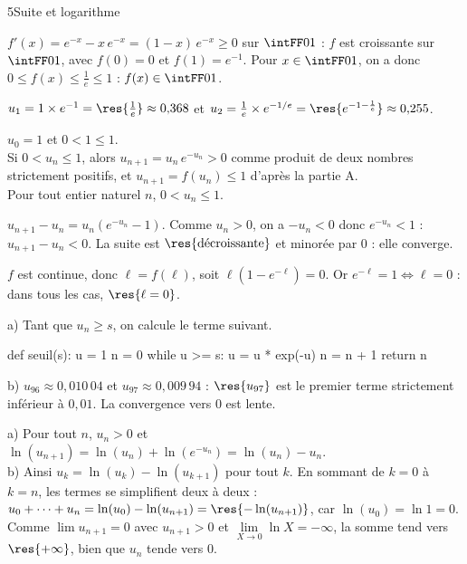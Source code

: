 \begin{corrigeBac}{5}{Suite et logarithme}
\begin{questions}
  \item $f'(x)=e^{-x}-x\,e^{-x}=(1-x)\,e^{-x}\geq0$ sur $\intFF01$ : $f$ est croissante sur $\intFF01$, avec $f(0)=0$ et $f(1)=e^{-1}$.
    Pour $x\in\intFF01$, on a donc $0\leq f(x)\leq\frac1e\leq1$ : $f(x)\in\intFF01$. 
\end{questions}
\begin{questions}[resume]
  \item $u_1=1\times e^{-1}=\res{\tfrac1e}\approx0{,}368$ et $u_2=\frac1e\times e^{-1/e}=\res{e^{-1-\frac1e}}\approx0{,}255$. 
  \item {} $u_0=1$ et $0<1\leq1$.\\
     Si $0<u_n\leq1$, alors $u_{n+1}=u_n\,e^{-u_n}>0$ comme produit de deux nombres strictement positifs, et
    $u_{n+1}=f(u_n)\leq1$ d'après la partie A.\\
     Pour tout entier naturel $n$, $0<u_n\leq1$. 
  \item $u_{n+1}-u_n=u_n\left(e^{-u_n}-1\right)$. Comme $u_n>0$, on a $-u_n<0$ donc $e^{-u_n}<1$ : $u_{n+1}-u_n<0$. La suite est
    $\res{\text{décroissante}}$ et minorée par $0$ : elle converge. 
  \item $f$ est continue, donc $\ell=f(\ell)$, soit $\ell\left(1-e^{-\ell}\right)=0$. Or $e^{-\ell}=1\iff\ell=0$ : dans tous les cas,
    $\res{\ell=0}$. 
  \item a) Tant que $u_n\geq s$, on calcule le terme suivant.
\begin{codecote}[0.46]
\begin{pythoncol}
def seuil(s):
    u = 1
    n = 0
    while u >= s:
        u = u * exp(-u)
        n = n + 1
    return n
\end{pythoncol}
\cote
b) $u_{96}\approx0{,}010\,04$ et $u_{97}\approx0{,}009\,94$ : $\res{u_{97}}$ est le premier terme strictement inférieur à $0{,}01$. La
convergence vers $0$ est lente.
\end{codecote}
  \item a) Pour tout $n$, $u_n>0$ et $\ln(u_{n+1})=\ln(u_n)+\ln\left(e^{-u_n}\right)=\ln(u_n)-u_n$.\\
    b) Ainsi $u_k=\ln(u_k)-\ln(u_{k+1})$ pour tout $k$. En sommant de $k=0$ à $k=n$, les termes se simplifient deux à deux :
    $u_0+\dots+u_n=\ln(u_0)-\ln(u_{n+1})=\res{-\ln(u_{n+1})}$, car $\ln(u_0)=\ln1=0$. Comme $\lim u_{n+1}=0$ avec $u_{n+1}>0$ et
    $\lim\limits_{X\to0}\ln X=-\infty$, la somme tend vers $\res{+\infty}$, bien que $u_n$ tende vers $0$. \pts{1 pt}
\end{questions}
\end{corrigeBac}


